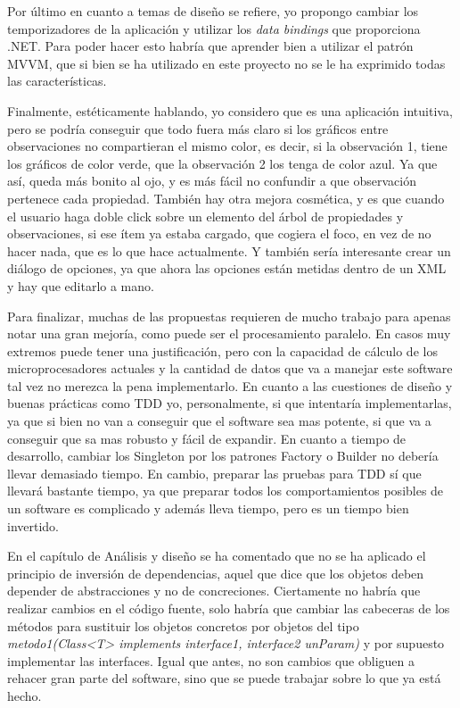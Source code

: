 Por \'ultimo en cuanto a temas de dise\~no se refiere, yo propongo cambiar los temporizadores de la
aplicaci\'on y utilizar los \emph{data bindings} que proporciona .NET. Para poder hacer esto
habr\'ia que aprender bien a utilizar el patr\'on MVVM, que si bien se ha utilizado en este proyecto
no se le ha exprimido todas las caracter\'isticas.

Finalmente, est\'eticamente hablando, yo considero que es una aplicaci\'on intuitiva, pero se podr\'ia conseguir
que todo fuera m\'as claro si los gr\'aficos entre observaciones no compartieran el mismo color,
es decir, si la observaci\'on 1, tiene los gr\'aficos de color verde, que la observaci\'on 2 los tenga de color azul.
Ya que as\'i, queda m\'as bonito al ojo, y es m\'as f\'acil no confundir a que observaci\'on pertenece cada propiedad.
Tambi\'en hay otra mejora cosm\'etica, y es que cuando el usuario haga doble click sobre un elemento del \'arbol
de propiedades y observaciones, si ese \'item ya estaba cargado, que cogiera el foco, en vez de no hacer nada, que 
es lo que hace actualmente. Y tambi\'en ser\'ia interesante crear un di\'alogo de opciones, ya que ahora las
opciones est\'an metidas dentro de un XML y hay que editarlo a mano.

Para finalizar, muchas de las propuestas requieren de mucho trabajo para apenas notar una gran mejor\'ia, como
puede ser el procesamiento paralelo. En casos muy extremos puede tener una justificaci\'on, pero con
la capacidad de c\'alculo de los microprocesadores actuales y la cantidad de datos que va a manejar este
software tal vez no merezca la pena implementarlo. En cuanto a las cuestiones de dise\~no y buenas pr\'acticas
como TDD yo, personalmente, si que intentar\'ia implementarlas, ya que si bien no van a conseguir que el software
sea mas potente, si que va a conseguir que sa mas robusto y f\'acil de expandir. En cuanto a tiempo de desarrollo,
cambiar los Singleton por los patrones Factory o Builder no deber\'ia llevar demasiado tiempo. En cambio, preparar
las pruebas para TDD s\'i que llevar\'a bastante tiempo, ya que preparar todos los comportamientos posibles de un software
es complicado y adem\'as lleva tiempo, pero es un tiempo bien invertido.

En el cap\'itulo de An\'alisis y dise\~no se ha comentado que no se ha aplicado el principio de inversi\'on de dependencias, 
aquel que dice que los objetos deben depender de abstracciones y no de concreciones. Ciertamente no habr\'ia que realizar 
cambios en el c\'odigo fuente, solo habr\'ia que cambiar las cabeceras de los m\'etodos para sustituir los objetos concretos
por objetos del tipo \emph{metodo1(Class<T> implements interface1, interface2 unParam)} y por supuesto implementar
las interfaces. Igual que antes, no son cambios que obliguen a rehacer gran parte del software, sino que se puede
trabajar sobre lo que ya est\'a hecho.

